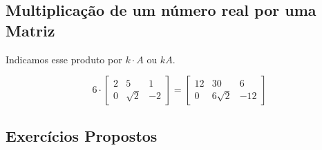 \subsection{Multiplicação de um número real por uma Matriz}


  Indicamos esse produto por $k \cdot A \text{ ou } kA $.
\begin{example}
  \[6 \cdot \begin{bmatrix}
    2 & 5 & 1 \\
    0 & \sqrt{2} & -2
  \end{bmatrix} = \begin{bmatrix}
    12 & 30 & 6 \\
    0 & 6\sqrt{2} & -12
  \end{bmatrix}\]
\end{example}

\subsection{Exercícios Propostos}

